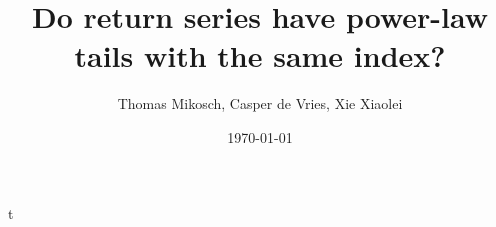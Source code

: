 \documentclass[11pt,a4]{amsart}
\newcommand{\1}{{\mathbf 1}}
\begin{document}
\title{Do return series have power-law tails with the same index?}
t\author{Thomas Mikosch,  Casper de Vries, Xie Xiaolei}
\date{\today}

\maketitle

\begin{abstract}
\end{abstract}
\end{document}
